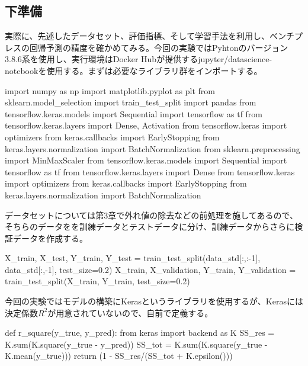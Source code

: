 \documentclass{article}
\begin{document}
\subsection{下準備}

実際に、先述したデータセット、評価指標、そして学習手法を利用し、ベンチプレスの回帰予測の精度を確かめてみる。今回の実験ではPyhtonのバージョン3.8.6系を使用し、実行環境はDocker Hubが提供するjupyter/datascience-notebookを使用する。まずは必要なライブラリ群をインポートする。
\\


\begin{python}
import numpy as np
import matplotlib.pyplot as plt
from sklearn.model_selection import train_test_split
import pandas
from tensorflow.keras.models import Sequential
import tensorflow as tf
from tensorflow.keras.layers import Dense, Activation
from tensorflow.keras import optimizers
from keras.callbacks import EarlyStopping
from keras.layers.normalization import BatchNormalization
from sklearn.preprocessing import MinMaxScaler
from tensorflow.keras.models import Sequential
import tensorflow as tf
from tensorflow.keras.layers import Dense
from tensorflow.keras import optimizers
from keras.callbacks import EarlyStopping
from keras.layers.normalization import BatchNormalization
\end{python}


データセットについては第3章で外れ値の除去などの前処理を施してあるので、そちらのデータをを訓練データとテストデータに分け、訓練データからさらに検証データを作成する。
\\


\begin{python}
X_train, X_test, Y_train, Y_test = 
train_test_split(data_std[:,:-1], data_std[:,-1], test_size=0.2)
X_train, X_validation, Y_train, Y_validation = 
train_test_split(X_train, Y_train, test_size=0.2)
\end{python}

今回の実験ではモデルの構築にKerasというライブラリを使用するが、Kerasには決定係数\begin{math}R^2\end{math}が用意されていないので、自前で定義する。
\\

\begin{python}
def r_square(y_true, y_pred):
    from keras import backend as K
    SS_res =  K.sum(K.square(y_true - y_pred)) 
    SS_tot = K.sum(K.square(y_true - K.mean(y_true))) 
    return (1 - SS_res/(SS_tot + K.epsilon()))
\end{python}
\end{document}
